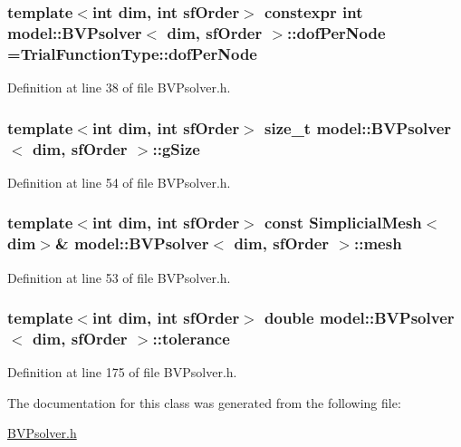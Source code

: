 \subsubsection[{dof\+Per\+Node}]{\setlength{\rightskip}{0pt plus 5cm}template$<$int dim, int sf\+Order$>$ constexpr int {\bf model\+::\+B\+V\+Psolver}$<$ {\bf dim}, sf\+Order $>$\+::dof\+Per\+Node =Trial\+Function\+Type\+::dof\+Per\+Node\hspace{0.3cm}{\ttfamily [static]}}\label{classmodel_1_1_b_v_psolver_ab34cc50436650a715cf182a4dc8edade}


Definition at line 38 of file B\+V\+Psolver.\+h.

\hypertarget{classmodel_1_1_b_v_psolver_a872a87ae25d1fd48774ea64c11db42b0}{}
\subsubsection[{g\+Size}]{\setlength{\rightskip}{0pt plus 5cm}template$<$int dim, int sf\+Order$>$ size\+\_\+t {\bf model\+::\+B\+V\+Psolver}$<$ {\bf dim}, sf\+Order $>$\+::g\+Size}\label{classmodel_1_1_b_v_psolver_a872a87ae25d1fd48774ea64c11db42b0}


Definition at line 54 of file B\+V\+Psolver.\+h.

\hypertarget{classmodel_1_1_b_v_psolver_a6148bf16d191dcc29291c3f173821884}{}
\subsubsection[{mesh}]{\setlength{\rightskip}{0pt plus 5cm}template$<$int dim, int sf\+Order$>$ const {\bf Simplicial\+Mesh}$<${\bf dim}$>$\& {\bf model\+::\+B\+V\+Psolver}$<$ {\bf dim}, sf\+Order $>$\+::mesh}\label{classmodel_1_1_b_v_psolver_a6148bf16d191dcc29291c3f173821884}


Definition at line 53 of file B\+V\+Psolver.\+h.

\hypertarget{classmodel_1_1_b_v_psolver_a5c184b11b6a8064ffaf99226ffcd7984}{}
\subsubsection[{tolerance}]{\setlength{\rightskip}{0pt plus 5cm}template$<$int dim, int sf\+Order$>$ double {\bf model\+::\+B\+V\+Psolver}$<$ {\bf dim}, sf\+Order $>$\+::tolerance}\label{classmodel_1_1_b_v_psolver_a5c184b11b6a8064ffaf99226ffcd7984}


Definition at line 175 of file B\+V\+Psolver.\+h.



The documentation for this class was generated from the following file\+:\begin{DoxyCompactItemize}
\item 
\hyperlink{_b_v_psolver_8h}{B\+V\+Psolver.\+h}\end{DoxyCompactItemize}
